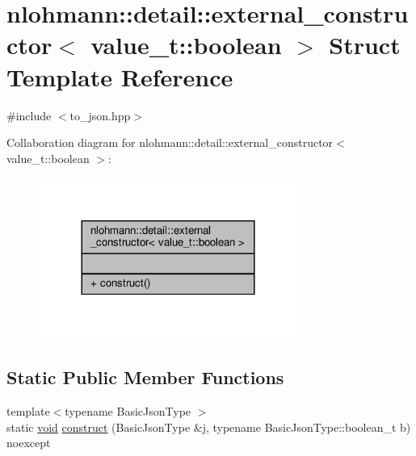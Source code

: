 \hypertarget{structnlohmann_1_1detail_1_1external__constructor_3_01value__t_1_1boolean_01_4}{}\section{nlohmann\+:\+:detail\+:\+:external\+\_\+constructor$<$ value\+\_\+t\+:\+:boolean $>$ Struct Template Reference}
\label{structnlohmann_1_1detail_1_1external__constructor_3_01value__t_1_1boolean_01_4}


{\ttfamily \#include $<$to\+\_\+json.\+hpp$>$}



Collaboration diagram for nlohmann\+:\+:detail\+:\+:external\+\_\+constructor$<$ value\+\_\+t\+:\+:boolean $>$\+:\nopagebreak
\begin{figure}[H]
\begin{center}
\leavevmode
\includegraphics[width=240pt]{structnlohmann_1_1detail_1_1external__constructor_3_01value__t_1_1boolean_01_4__coll__graph}
\end{center}
\end{figure}
\subsection*{Static Public Member Functions}
\begin{DoxyCompactItemize}
\item 
{\footnotesize template$<$typename Basic\+Json\+Type $>$ }\\static \hyperlink{namespacenlohmann_1_1detail_a59fca69799f6b9e366710cb9043aa77d}{void} \hyperlink{structnlohmann_1_1detail_1_1external__constructor_3_01value__t_1_1boolean_01_4_a867122bcf0856c757bd6bcbfb8be74bc}{construct} (Basic\+Json\+Type \&j, typename Basic\+Json\+Type\+::boolean\+\_\+t b) noexcept
\end{DoxyCompactItemize}


